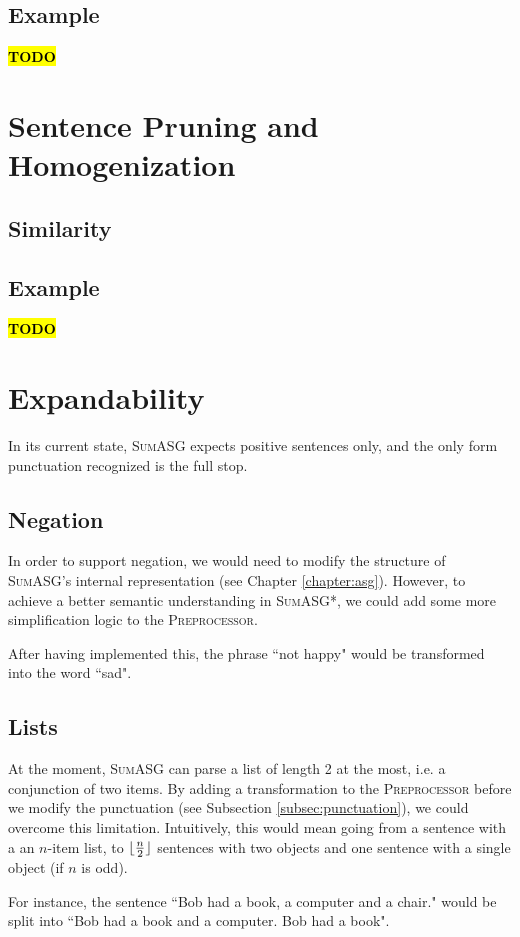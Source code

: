 \subsection{Example}

\textcolor{red}{\textbf{\hl{TODO}}}

\section{Sentence Pruning and Homogenization}

\subsection{Similarity}
\label{subsec:similarity}

\subsection{Example}

\textcolor{red}{\textbf{\hl{TODO}}}

\section{Expandability}

In its current state, \textsc{SumASG} expects positive sentences only, and the only form punctuation recognized is the full stop.

\subsection{Negation}

In order to support negation, we would need to modify the structure of \textsc{SumASG}'s internal representation (see Chapter \ref{chapter:asg}). However, to achieve a better semantic understanding in \textsc{SumASG*}, we could add some more simplification logic to the \textsc{Preprocessor}.

After having implemented this, the phrase ``not happy" would be transformed into the word ``sad".

\subsection{Lists}

At the moment, \textsc{SumASG} can parse a list of length 2 at the most, i.e. a conjunction of two items. By adding a transformation to the \textsc{Preprocessor} before we modify the punctuation (see Subsection \ref{subsec:punctuation}), we could overcome this limitation. Intuitively, this would mean going from a sentence with a an $n$-item list, to $\lfloor \frac{n}{2} \rfloor$ sentences with two objects and one sentence with a single object (if $n$ is odd).

For instance, the sentence ``Bob had a book, a computer and a chair." would be split into ``Bob had a book and a computer. Bob had a book".